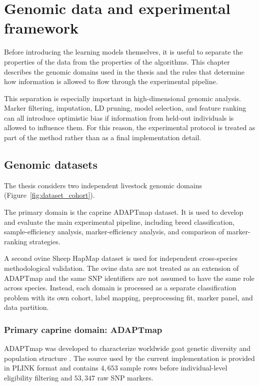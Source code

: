 \chapter{Genomic data and experimental framework}
\label{chap:experimental_framework}
\label{chap:methods}

Before introducing the learning models themselves, it is useful to
separate the properties of the data from the properties of the
algorithms. This chapter describes the genomic domains used in the
thesis and the rules that determine how information is allowed to flow
through the experimental pipeline.

This separation is especially important in high-dimensional genomic
analysis. Marker filtering, imputation, LD pruning, model selection,
and feature ranking can all introduce optimistic bias if information
from held-out individuals is allowed to influence them. For this
reason, the experimental protocol is treated as part of the method
rather than as a final implementation detail.

\section{Genomic datasets}
\label{sec:genomic_datasets_preprocessing}

The thesis considers two independent livestock genomic domains
(Figure~\ref{fig:dataset_cohort}).

The primary domain is the caprine ADAPTmap dataset. It is used to
develop and evaluate the main experimental pipeline, including breed
classification, sample-efficiency analysis, marker-efficiency
analysis, and comparison of marker-ranking strategies.

A second ovine Sheep HapMap dataset is used for independent
cross-species methodological validation. The ovine data are not
treated as an extension of ADAPTmap and the same SNP identifiers are
not assumed to have the same role across species. Instead, each domain
is processed as a separate classification problem with its own cohort,
label mapping, preprocessing fit, marker panel, and data partition.

\subsection{Primary caprine domain: ADAPTmap}
\label{subsec:adaptmap_dataset}

ADAPTmap was developed to characterize worldwide goat genetic
diversity and population structure
\cite{stella2018adaptmap, colli2018genome}. The source used by the
current implementation is provided in PLINK format and contains
$4{,}653$ sample rows before individual-level eligibility filtering and
$53{,}347$ raw SNP markers.

